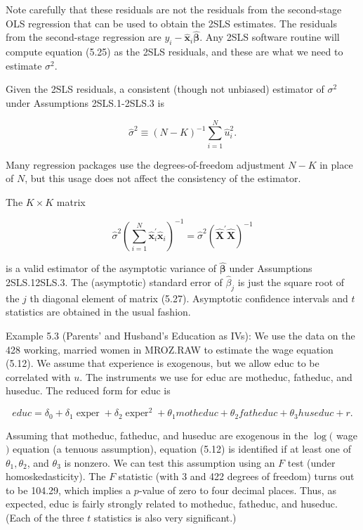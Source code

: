 \documentclass[10pt]{article}
\begin{document}
Note carefully that these residuals are not the residuals from the second-stage OLS regression that can be used to obtain the 2SLS estimates. The residuals from the second-stage regression are $y_{i}-\hat{\mathbf{x}}_{i} \hat{\boldsymbol{\beta}}$. Any 2SLS software routine will compute equation (5.25) as the 2SLS residuals, and these are what we need to estimate $\sigma^{2}$.

Given the 2SLS residuals, a consistent (though not unbiased) estimator of $\sigma^{2}$ under Assumptions 2SLS.1-2SLS.3 is


\begin{equation*}
\hat{\sigma}^{2} \equiv(N-K)^{-1} \sum_{i=1}^{N} \hat{u}_{i}^{2} . \tag{5.26}
\end{equation*}


Many regression packages use the degrees-of-freedom adjustment $N-K$ in place of $N$, but this usage does not affect the consistency of the estimator.

The $K \times K$ matrix


\begin{equation*}
\hat{\sigma}^{2}\left(\sum_{i=1}^{N} \hat{\mathbf{x}}_{i}^{\prime} \hat{\mathbf{x}}_{i}\right)^{-1}=\hat{\sigma}^{2}\left(\hat{\mathbf{X}}^{\prime} \hat{\mathbf{X}}\right)^{-1} \tag{5.27}
\end{equation*}


is a valid estimator of the asymptotic variance of $\hat{\boldsymbol{\beta}}$ under Assumptions 2SLS.12SLS.3. The (asymptotic) standard error of $\hat{\beta}_{j}$ is just the square root of the $j$ th diagonal element of matrix (5.27). Asymptotic confidence intervals and $t$ statistics are obtained in the usual fashion.

Example 5.3 (Parents' and Husband's Education as IVs): We use the data on the 428 working, married women in MROZ.RAW to estimate the wage equation (5.12). We assume that experience is exogenous, but we allow educ to be correlated with $u$. The instruments we use for educ are motheduc, fatheduc, and huseduc. The reduced form for educ is

$$
e d u c=\delta_{0}+\delta_{1} \operatorname{exper}+\delta_{2} \operatorname{exper}^{2}+\theta_{1} m o t h e d u c+\theta_{2} f a t h e d u c+\theta_{3} h u s e d u c+r .
$$

Assuming that motheduc, fatheduc, and huseduc are exogenous in the $\log ($ wage $)$ equation (a tenuous assumption), equation (5.12) is identified if at least one of $\theta_{1}, \theta_{2}$, and $\theta_{3}$ is nonzero. We can test this assumption using an $F$ test (under homoskedasticity). The $F$ statistic (with 3 and 422 degrees of freedom) turns out to be 104.29, which implies a $p$-value of zero to four decimal places. Thus, as expected, educ is fairly strongly related to motheduc, fatheduc, and huseduc. (Each of the three $t$ statistics is also very significant.)
\end{document}
